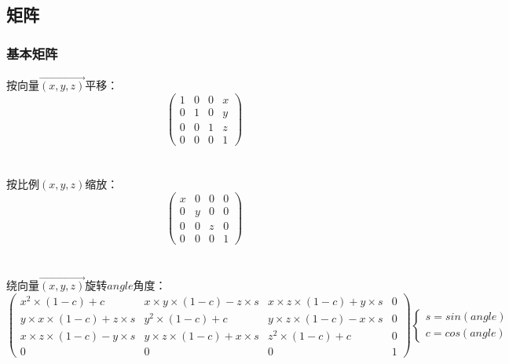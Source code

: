 \subsection{矩阵}
    \subsubsection{基本矩阵}
	按向量$\overrightarrow{(x,y,z)}$平移：
	\[\begin{pmatrix}
	1 & 0 & 0 & x\\ 
	0 & 1 & 0 & y\\ 
	0 & 0 & 1 & z\\ 
	0 & 0 & 0 & 1
	\end{pmatrix}\]\\
	\\
	按比例$(x,y,z)$缩放：
	\[\begin{pmatrix}
	x & 0 & 0 & 0\\ 
	0 & y & 0 & 0\\ 
	0 & 0 & z & 0\\ 
	0 & 0 & 0 & 1
	\end{pmatrix}\]\\
	\\
	绕向量$\overrightarrow{(x,y,z)}$旋转$angle$角度：
	\[\begin{pmatrix}
	x^2\times (1-c)+c & x\times y\times (1-c)-z\times s & x\times z\times (1-c)+y\times s & 0\\ 
	y\times x\times (1-c)+z\times s & y^2\times (1-c)+c & y\times z\times (1-c)-x\times s & 0\\ 
	x\times z\times (1-c)-y\times s & y\times z\times (1-c)+x\times s & z^2\times (1-c)+c & 0\\ 
	0 & 0 & 0 & 1
	\end{pmatrix}
	\begin{cases}
	s=sin(angle)\\
	c=cos(angle)
	\end{cases}\]
	
